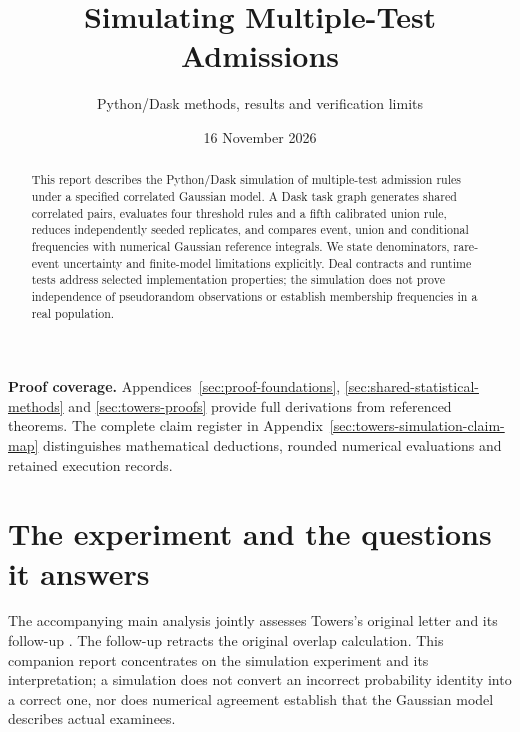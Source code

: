 
\title{Simulating Multiple-Test Admissions}
\subtitle{Python/Dask methods, results and verification limits}
\author{\ProjectAuthor}
\date{16 November 2026}

\renewcommand{\ProjectReportHighlights}{Seeded Python/Dask experiments estimate union, intersection and
conditional event frequencies for correlated Gaussian tests and compare
them with reference integrals. The reported counts and uncertainty
do not establish actual membership frequencies.}


\frontmatter
\ProjectReportTitlePage


\begin{abstract}
This report describes the Python/Dask simulation of multiple-test admission
rules under a specified correlated Gaussian model. A Dask task graph
generates shared correlated pairs, evaluates four threshold rules and a
fifth calibrated union rule, reduces independently seeded replicates,
and compares event, union and conditional frequencies with numerical
Gaussian reference integrals. We state denominators, rare-event
uncertainty and finite-model limitations explicitly. Deal contracts
and runtime tests address selected implementation properties; the
simulation does not prove independence of pseudorandom observations
or establish membership frequencies in a real population.
\end{abstract}

\noindent\textbf{Proof coverage.} Appendices~\ref{sec:proof-foundations},
\ref{sec:shared-statistical-methods} and \ref{sec:towers-proofs} provide full
derivations from referenced theorems. The complete claim register in
Appendix~\ref{sec:towers-simulation-claim-map} distinguishes mathematical
deductions, rounded numerical evaluations and retained execution records.

\tableofcontents
\mainmatter
\chapter{The experiment and the questions it answers}

The accompanying main analysis jointly assesses Towers's original letter and
its follow-up \citep{towersOriginal,towersFollowup}. The follow-up retracts the
original overlap calculation. This companion report concentrates on the
simulation experiment and its interpretation; a simulation does not convert
an incorrect probability identity into a correct one, nor does numerical
agreement establish that the Gaussian model describes actual examinees.

